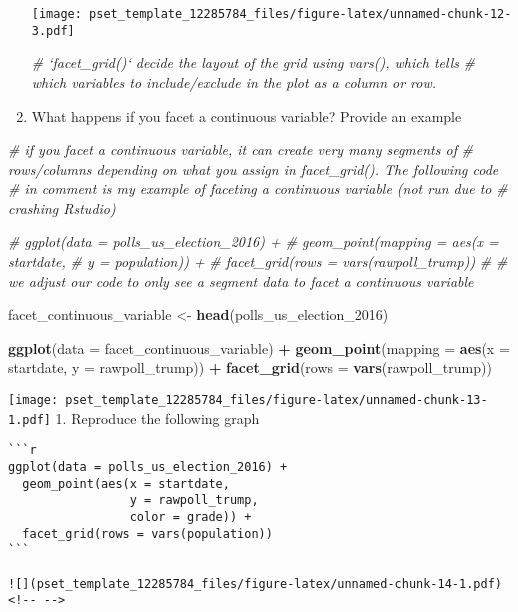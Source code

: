 \documentclass[
]{article}
\newenvironment{Shaded}{\begin{snugshade}}{\end{snugshade}}
\newcommand{\CommentTok}[1]{\textcolor[rgb]{0.56,0.35,0.01}{\textit{#1}}}
\newcommand{\DataTypeTok}[1]{\textcolor[rgb]{0.13,0.29,0.53}{#1}}
\newcommand{\DecValTok}[1]{\textcolor[rgb]{0.00,0.00,0.81}{#1}}
\newcommand{\KeywordTok}[1]{\textcolor[rgb]{0.13,0.29,0.53}{\textbf{#1}}}
\newcommand{\NormalTok}[1]{#1}
\newcommand{\OperatorTok}[1]{\textcolor[rgb]{0.81,0.36,0.00}{\textbf{#1}}}
\newcommand{\StringTok}[1]{\textcolor[rgb]{0.31,0.60,0.02}{#1}}
\begin{document}
\begin{enumerate}
  \texttt{[image: pset\_template\_12285784\_files/figure-latex/unnamed-chunk-12-3.pdf]}

\begin{Shaded}
\begin{Highlighting}[]
\CommentTok{# `facet_grid()` decide the layout of the grid using vars(), which tells }
\CommentTok{# which variables to include/exclude in the plot as a column or row.}
\end{Highlighting}
\end{Shaded}
\item
  What happens if you facet a continuous variable? Provide an example
\end{enumerate}

\begin{Shaded}
\begin{Highlighting}[]
\CommentTok{# if you facet a continuous variable, it can create very many segments of }
\CommentTok{# rows/columns depending on what you assign in facet_grid(). The following code }
\CommentTok{# in comment is my example of faceting a continuous variable (not run due to }
\CommentTok{# crashing Rstudio)}

\CommentTok{#    ggplot(data = polls_us_election_2016) + }
\CommentTok{#      geom_point(mapping = aes(x = startdate, }
\CommentTok{#                               y = population)) +}
\CommentTok{#      facet_grid(rows = vars(rawpoll_trump))}
\CommentTok{#}
\CommentTok{# we adjust our code to only see a segment data to facet a continuous variable}

\NormalTok{facet_continuous_variable <-}\StringTok{ }\KeywordTok{head}\NormalTok{(polls_us_election_}\DecValTok{2016}\NormalTok{)}

    \KeywordTok{ggplot}\NormalTok{(}\DataTypeTok{data =}\NormalTok{ facet_continuous_variable) }\OperatorTok{+}\StringTok{ }
\StringTok{      }\KeywordTok{geom_point}\NormalTok{(}\DataTypeTok{mapping =} \KeywordTok{aes}\NormalTok{(}\DataTypeTok{x =}\NormalTok{ startdate, }
                               \DataTypeTok{y =}\NormalTok{ rawpoll_trump)) }\OperatorTok{+}
\StringTok{      }\KeywordTok{facet_grid}\NormalTok{(}\DataTypeTok{rows =} \KeywordTok{vars}\NormalTok{(rawpoll_trump))}
\end{Highlighting}
\end{Shaded}

\texttt{[image: pset\_template\_12285784\_files/figure-latex/unnamed-chunk-13-1.pdf]}
1. Reproduce the following graph

\begin{verbatim}
```r
ggplot(data = polls_us_election_2016) +
  geom_point(aes(x = startdate, 
                 y = rawpoll_trump, 
                 color = grade)) +
  facet_grid(rows = vars(population))
```

![](pset_template_12285784_files/figure-latex/unnamed-chunk-14-1.pdf)<!-- --> 
\end{verbatim}
\end{document}
